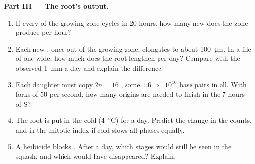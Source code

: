 \begin{problem}
\medskip
\noindent\textbf{Part III --- The root's output.}
\begin{enumerate}[resume]
  \item If every  of the growing zone cycles in 20 hours, how many
        new  does the zone produce per hour?
  \item Each new , once out of the growing zone, elongates to about
        \qty{100}{\micro m}. In a file of  one  wide, how much
        does the root lengthen per day? Compare with the observed
        \qty{1}{mm} a day and explain the difference.
  \item Each daughter  must copy $2n = 16$ , some
        $\num{1.6e10}$ base pairs in all. With forks of 50 
        per second, how many origins are needed to finish in the 7
        hours of S?
  \item The root is put in the cold (\qty{4}{\celsius}) for a day.
        Predict the change in the counts, and in the mitotic index if
        cold slows all phases equally.
  \item A herbicide blocks . After a day, which stages
        would still be seen in the squash, and which would have
        disappeared? Explain.
\end{enumerate}


\end{problem}
